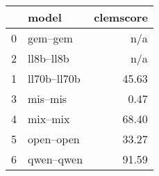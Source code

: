 \begin{tabular}{llr}
\toprule
 & model & clemscore \\
\midrule
0 & gem--gem & n/a \\
2 & ll8b--ll8b & n/a \\
1 & ll70b--ll70b & 45.63 \\
3 & mis--mis & 0.47 \\
4 & mix--mix & 68.40 \\
5 & open--open & 33.27 \\
6 & qwen--qwen & 91.59 \\
\bottomrule
\end{tabular}
